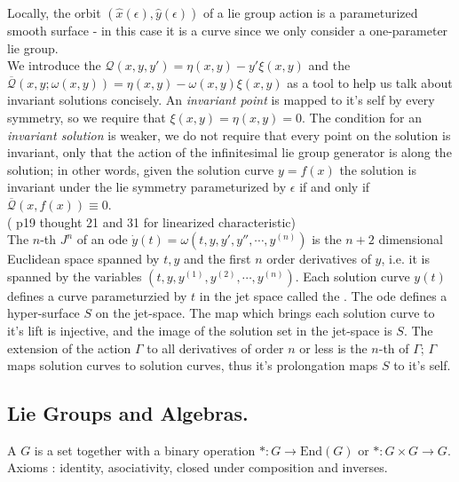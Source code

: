 \documentclass[12pt]{article}
\begin{document}
Locally, the orbit $(\hat x(\epsilon),\hat y(\epsilon))$ of a lie group action is a parameturized smooth surface - in this case it is a curve since we only consider a one-parameter lie group. 
\\


We introduce the  $\mathcal Q(x,y,y')=\eta(x,y)-y'\xi(x,y)$ and the  $\mathcal{\overline Q}(x,y;\omega(x,y)) = \eta(x,y)-\omega(x,y)\xi(x,y)$ as a tool to help us talk about invariant solutions concisely. An \textit{invariant point} is mapped to it's self by every symmetry, so we require that $\xi(x,y) = \eta(x,y) = 0$. The condition for an \textit{invariant solution} is weaker, we do not require that every point on the solution is invariant, only that the action of the infinitesimal lie group generator is along the solution; in other words, given the solution curve $y=f(x)$ the solution is invariant under the lie symmetry parameturized by $\epsilon$ if and only if $\mathcal{\overline Q}(x,f(x)) \equiv 0$. \\ 


(\cite{Symmetry-methods} p19 thought 21 and 31 for linearized characteristic)\\ 

The $n$-th  $J^n$ of an ode $\dot y(t) = \omega(t,y,y',y'',\cdots,y^{(n)})$ is the $n+2$ dimensional Euclidean space spanned by $t,y$ and the first $n$ order derivatives of $y$, i.e. it is spanned by the variables $(t,y,y^{(1)},y^{(2)},\cdots,y^{(n)})$. Each solution curve $y(t)$ defines a curve parameturzied by $t$ in the jet space called the . The ode defines a hyper-surface $S$ on the jet-space. The map which brings each solution curve to it's lift is injective, and the image of the solution set in the jet-space is $S$. The extension of the action $\Gamma$ to all derivatives of order $n$ or less is the $n$-th  of $\Gamma$; $\Gamma$ maps solution curves to solution curves, thus it's prolongation maps $S$ to it's self. 

\subsection{Lie Groups and Algebras.}

A  $G$ is a set together with a binary operation $\ast : G \to \text{End} (G)$ or $\ast : G\times G \to G$. Axioms : identity, asociativity, closed under composition and inverses. \\
\end{document}
